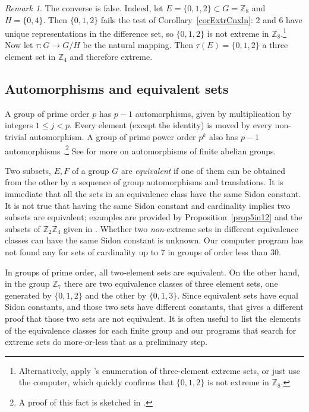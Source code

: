 \documentclass[letter,11pt]{amsart}
\numberwithin{theorem}{section}
\theoremstyle{remark}
\newtheorem{rem}[theorem]{Remark}
\numberwithin{equation}{section}
\newcommand{\corref}[1]{Corollary~\ref{#1}}
\newcommand{\propref}[1]{Proposition~\ref{#1}}
\newcommand\Times{\text{$\times$}} %
\newcommand\Zp[2]{\texttt{$\mathbb Z_{#1}^{\	#2}$}}
\begin{document}
 \begin{rem} \label{remRamseyNoLifting}
 The converse is false. Indeed, let $E=\{0,1,2\}\subset G=\Zp{8}{}$ and $H=\{0,4\}.$
Then $\{0,1,2\} $  fails the test of \corref{corExtrCnxln}: 2 and 6 have unique representations in the difference set,
 so $\{0,1,2\}$ is not extreme in \Zp8{}.\footnote{Alternatively, apply 
   \cite[3.1]{MR627683}'s enumeration of three-element extreme sets, or  just use the computer, which quickly
    confirms that $\{0,1,2\}$ is not extreme in \Zp8{}.}
 Now
 let $\tau:G \to G/H$ be the natural mapping. Then $\tau(E)=\{0,1,2\}$ a
 three element set in $\Zp4{}$ and therefore  extreme.
 \end{rem}
 
 
\subsection{Automorphisms and equivalent sets}

A group of prime order $p$ has $p-1$ automorphisms, given by multiplication by integers $1\le j<p$.
 Every element (except the identity) is moved by every non-trivial automorphism. 
A group of prime power order $p^k$ also has $p-1$ automorphisms 
\cite[Thm. 4.1]{MR2363058}.\footnote{A proof of this fact is 
sketched in \cite{ABeastiaryAppendix}.}
See \cite{MR2666671, MR2363058, MR2103185, MR1512510}
 for more  on automorphisms of
finite abelian groups. 

Two subsets, $E,F$ of a group $G$ are \emph{equivalent}
 if one of them can be obtained from the other
by a sequence of group automorphisms and translations. 
It is immediate that
all the sets in an equivalence class have 
the same Sidon constant. It is not true that
having the same Sidon constant and cardinality implies two subsets
 are equivalent; examples are provided by
\propref{prop5in12} and the subsets of \Zp2{}\Times\Zp4{}
 given in \cite[3.3 (i)]{MR627683}.
Whether two \emph{non}-extreme sets in different 
 equivalence classes can have the same Sidon
constant is unknown. Our computer program has not 
found any for sets of cardinality up to  7 in
groups of order less than 30.


\bigbreak

In groups of prime order, all two-element sets are equivalent. 
On the other hand, in the group $\Zp 7{}$ there are two 
equivalence classes of three element sets, one
generated by $\{0,1,2\}$ and the other 
by $\{0,1,3\}$. Since equivalent sets have 
 equal Sidon constants, and those two sets have different constants, that gives a different proof that
those two sets are not equivalent.
It is often useful to list the elements of the equivalence classes 
for each finite group and our programs that search for extreme sets do more-or-less that as a
preliminary step.%
\end{document}
